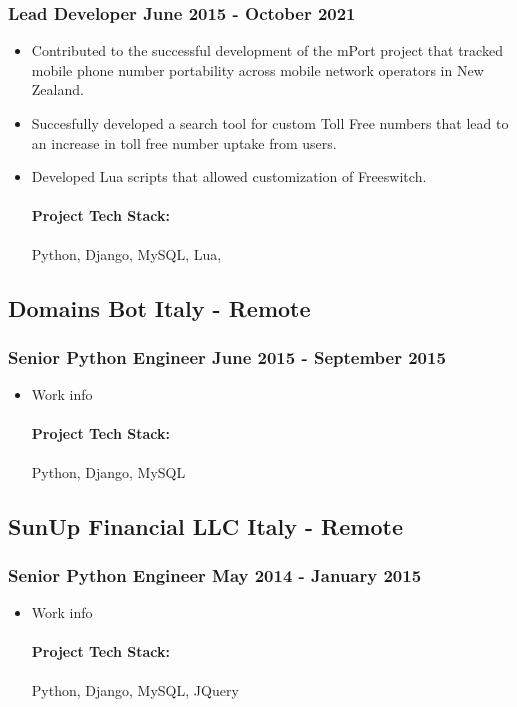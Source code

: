 \documentclass[11pt]{article} %
\begin{document}
\subsubsection{Lead Developer \hfill  June 2015 - October 2021}
\begin{itemize}
    \item Contributed to the successful development of the mPort project that tracked mobile phone number portability across mobile network operators in New Zealand.
    \item Succesfully developed a search tool for custom Toll Free numbers that lead to an increase in toll free number uptake from users.
    \item Developed Lua scripts that allowed customization of Freeswitch. 

    \paragraph{Project Tech Stack:} Python, Django, MySQL, Lua,
\end{itemize}

\subsection{Domains Bot \hfill Italy - Remote}
\subsubsection{Senior Python Engineer \hfill  June 2015 - September 2015}
\begin{itemize}
    \item Work info
    \paragraph{Project Tech Stack:} Python, Django, MySQL
\end{itemize}

\subsection{SunUp Financial LLC \hfill Italy - Remote}
\subsubsection{Senior Python Engineer \hfill  May 2014 - January 2015}
\begin{itemize}
    \item Work info
    \paragraph{Project Tech Stack:} Python, Django, MySQL, JQuery
\end{itemize}
\end{document}
